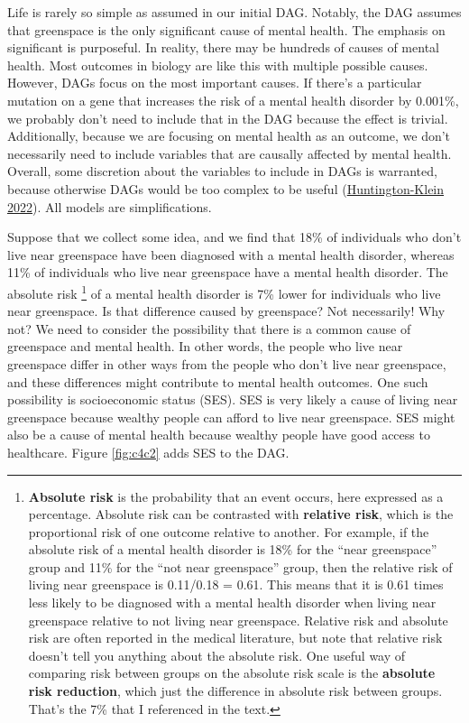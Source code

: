 \documentclass[
]{book}
\begin{document}
Life is rarely so simple as assumed in our initial DAG. Notably, the DAG assumes that greenspace is the only significant cause of mental health. The emphasis on significant is purposeful. In reality, there may be hundreds of causes of mental health. Most outcomes in biology are like this with multiple possible causes. However, DAGs focus on the most important causes. If there's a particular mutation on a gene that increases the risk of a mental health disorder by 0.001\%, we probably don't need to include that in the DAG because the effect is trivial. Additionally, because we are focusing on mental health as an outcome, we don't necessarily need to include variables that are causally affected by mental health. Overall, some discretion about the variables to include in DAGs is warranted, because otherwise DAGs would be too complex to be useful (\href{https://theeffectbook.net/}{Huntington-Klein 2022}). All models are simplifications.

Suppose that we collect some idea, and we find that 18\% of individuals who don't live near greenspace have been diagnosed with a mental health disorder, whereas 11\% of individuals who live near greenspace have a mental health disorder. The absolute risk \footnote{\textbf{Absolute risk} is the probability that an event occurs, here expressed as a percentage. Absolute risk can be contrasted with \textbf{relative risk}, which is the proportional risk of one outcome relative to another. For example, if the absolute risk of a mental health disorder is 18\% for the ``near greenspace'' group and 11\% for the ``not near greenspace'' group, then the relative risk of living near greenspace is 0.11/0.18 = 0.61. This means that it is 0.61 times less likely to be diagnosed with a mental health disorder when living near greenspace relative to not living near greenspace. Relative risk and absolute risk are often reported in the medical literature, but note that relative risk doesn't tell you anything about the absolute risk. One useful way of comparing risk between groups on the absolute risk scale is the \textbf{absolute risk reduction}, which just the difference in absolute risk between groups. That's the 7\% that I referenced in the text.} of a mental health disorder is 7\% lower for individuals who live near greenspace. Is that difference caused by greenspace? Not necessarily! Why not? We need to consider the possibility that there is a common cause of greenspace and mental health. In other words, the people who live near greenspace differ in other ways from the people who don't live near greenspace, and these differences might contribute to mental health outcomes. One such possibility is socioeconomic status (SES). SES is very likely a cause of living near greenspace because wealthy people can afford to live near greenspace. SES might also be a cause of mental health because wealthy people have good access to healthcare. Figure \ref{fig:c4c2} adds SES to the DAG.
\end{document}
